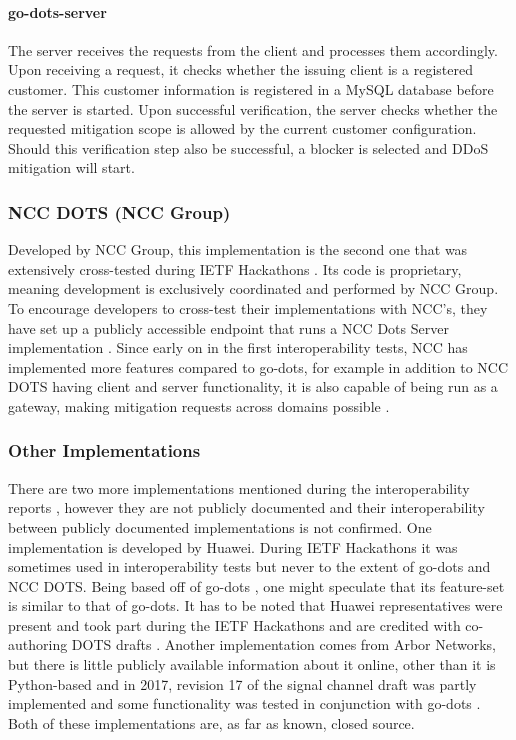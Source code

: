 \paragraph{go-dots-server}The server receives the requests from the client and processes them accordingly. Upon receiving a request, it checks whether the issuing client is a registered customer. This customer information is registered in a MySQL database before the server is started. Upon successful verification, the server checks whether the requested mitigation scope is allowed by the current customer configuration. Should this verification step also be successful, a blocker is selected and DDoS mitigation will start.

\subsubsection{NCC DOTS (NCC Group)}
Developed by NCC Group, this implementation is the second one that was extensively cross-tested during IETF Hackathons \cite{interop-100, interop-101, interop-102, interop-103, interop-104}. Its code is proprietary, meaning development is exclusively coordinated and performed by NCC Group. To encourage developers to cross-test their implementations with NCC's, they have set up a publicly accessible endpoint that runs a NCC Dots Server implementation \cite{ncc-public-server, ncc-implementation}. Since early on in the first interoperability tests, NCC has implemented more features compared to go-dots, for example in addition to NCC DOTS having client and server functionality, it is also capable of being run as a gateway, making mitigation requests across domains possible \cite{interop-100}.

\subsubsection{Other Implementations}
There are two more implementations mentioned during the interoperability reports \cite{interop-101}, however they are not publicly documented and their interoperability between publicly documented implementations is not confirmed. One implementation is developed by Huawei. During IETF Hackathons it was sometimes used in interoperability tests but never to the extent of go-dots and NCC DOTS. Being based off of go-dots \cite{interop-101}, one might speculate that its feature-set is similar to that of go-dots. It has to be noted that Huawei representatives were present and took part during the IETF Hackathons and are credited with co-authoring DOTS drafts \cite{interop-103}.
Another implementation comes from Arbor Networks, but there is little publicly available information about it online, other than it is Python-based and in 2017, revision 17 of the signal channel draft was partly implemented and some functionality was tested in conjunction with go-dots \cite{arbor-101}. Both of these implementations are, as far as known, closed source.


